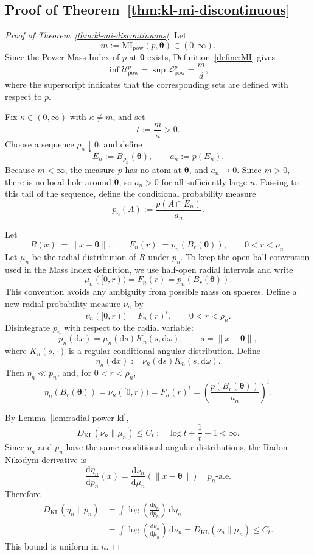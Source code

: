 \documentclass[11pt,a4paper]{article}
\newcommand{\MI}{\mathrm{MI}}
\newcommand{\pa}{\boldsymbol\theta}
\theoremstyle{compactplain}
\theoremstyle{compactdefinition}
\numberwithin{equation}{section}
\begin{document}
\subsection*{Proof of Theorem~\ref{thm:kl-mi-discontinuous}}
\begin{proof}[Proof of Theorem~\ref{thm:kl-mi-discontinuous}]
Let
\[
 m:=\MI_{\mathrm{pow}}(p,\pa)\in(0,\infty).
\]
Since the Power Mass Index of \(p\) at \(\pa\) exists, Definition~\ref{define:MI} gives
\[
 \inf\mathcal U_{\mathrm{pow}}^p
 =
 \sup\mathcal L_{\mathrm{pow}}^p
 =
 \frac md,
\]
where the superscript indicates that the corresponding sets are defined with
respect to \(p\).

Fix \(\kappa\in(0,\infty)\) with \(\kappa\neq m\), and set
\[
 t:=\frac m\kappa>0 .
\]
Choose a sequence \(\rho_n\downarrow0\), and define
\[
 E_n:=B_{\rho_n}(\pa),
 \qquad
 a_n:=p(E_n).
\]
Because \(m<\infty\), the measure \(p\) has no atom at \(\pa\), and
\(a_n\to0\). Since \(m>0\), there is no local hole around \(\pa\), so
\(a_n>0\) for all sufficiently large \(n\). Passing to this tail of the
sequence, define the conditional probability measure
\[
 p_n(A):=\frac{p(A\cap E_n)}{a_n}.
\]

Let
\[
 R(x):=\|x-\pa\|,
 \qquad
 F_n(r):=p_n(B_r(\pa)),
 \qquad 0<r<\rho_n .
\]
Let \(\mu_n\) be the radial distribution of \(R\) under \(p_n\). To keep the
open-ball convention used in the Mass Index definition, we use half-open radial
intervals and write
\[
 \mu_n([0,r))=F_n(r)=p_n(B_r(\pa)).
\]
This convention avoids any ambiguity from possible mass on spheres. Define a
new radial probability measure \(\nu_n\) by
\[
 \nu_n([0,r))=F_n(r)^t,
 \qquad 0<r<\rho_n .
\]
Disintegrate \(p_n\) with respect to the radial variable:
\[
 p_n(\mathrm d x)=\mu_n(\mathrm d s)K_n(s,\mathrm d\omega),
 \qquad s=\|x-\pa\|,
\]
where \(K_n(s,\cdot)\) is a regular conditional angular distribution. Define
\[
 \eta_n(\mathrm d x):=\nu_n(\mathrm d s)K_n(s,\mathrm d\omega).
\]
Then \(\eta_n\ll p_n\), and, for \(0<r<\rho_n\),
\[
 \eta_n(B_r(\pa))
 =\nu_n([0,r))
 =F_n(r)^t
 =\left(\frac{p(B_r(\pa))}{a_n}\right)^t .
\]

By Lemma~\ref{lem:radial-power-kl},
\[
 D_{\mathrm{KL}}(\nu_n\|\mu_n)
 \le
 C_t:=\log t+\frac1t-1<\infty .
\]
Since \(\eta_n\) and \(p_n\) have the same conditional angular distributions, the
Radon--Nikodym derivative is
\[
 \frac{\mathrm d\eta_n}{\mathrm d p_n}(x)
 =
 \frac{\mathrm d\nu_n}{\mathrm d\mu_n}(\|x-\pa\|)
 \quad p_n\text{-a.e.}
\]
Therefore
\[
\begin{aligned}
 D_{\mathrm{KL}}(\eta_n\|p_n)
 &=\int \log\!\left(\frac{\mathrm d\eta_n}{\mathrm d p_n}\right)
       \,\mathrm d\eta_n  \\
 &=\int \log\!\left(\frac{\mathrm d\nu_n}{\mathrm d\mu_n}\right)
       \,\mathrm d\nu_n
 =D_{\mathrm{KL}}(\nu_n\|\mu_n)
 \le C_t .
\end{aligned}
\]
This bound is uniform in \(n\).


\end{proof}
\end{document}
